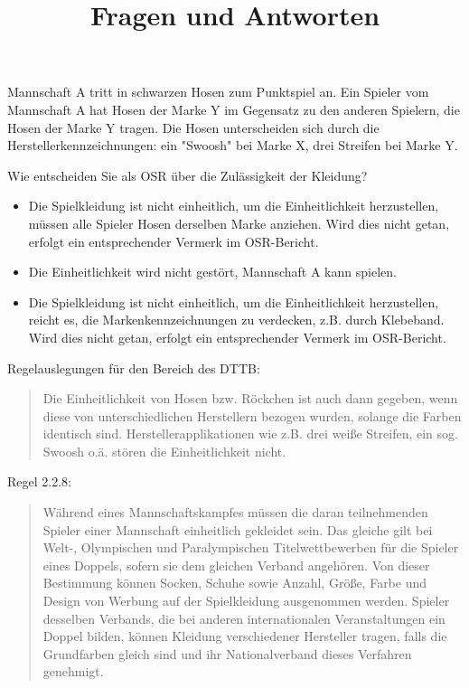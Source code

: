 \documentclass[english, ngerman]{scrartcl}
\title{Fragen und Antworten}
\newcommand{\itemsquarech}[1][black]{%
	\setlength{\unitlength}{1.4ex}%
	\linethickness{1pt}
	\begin{picture}(1,1)(0,0)%
		\color{#1}%
		\moveto(0, 0)%
		\lineto(0, 1)%
		\lineto(1, 1)%
		\lineto(1, 0)%
		\closepath\strokepath%
		\color{green}%
		\Line(0,0)(1,1)
		\Line(0,1)(1,0)
	\end{picture}%
}
\begin{document}
	\maketitle


	Mannschaft A tritt in schwarzen Hosen zum Punktspiel an.
	Ein Spieler vom Mannschaft A hat Hosen der Marke Y im Gegensatz zu den anderen Spielern, die Hosen der Marke Y tragen.
	Die Hosen unterscheiden sich durch die Herstellerkennzeichnungen: ein "Swoosh" bei Marke X, drei Streifen bei Marke Y.

	Wie entscheiden Sie als OSR über die Zulässigkeit der Kleidung?

	\begin{itemize}
		\item Die Spielkleidung ist nicht einheitlich, um die Einheitlichkeit herzustellen, müssen alle Spieler Hosen derselben Marke anziehen.
			Wird dies nicht getan, erfolgt ein entsprechender Vermerk im OSR-Bericht.
		\item[\itemsquarech] Die Einheitlichkeit wird nicht gestört, Mannschaft A kann spielen.
		\item Die Spielkleidung ist nicht einheitlich, um die Einheitlichkeit herzustellen, reicht es, die Markenkennzeichnungen zu verdecken, z.B. durch Klebeband.
			Wird dies nicht getan, erfolgt ein entsprechender Vermerk im OSR-Bericht.
	\end{itemize}

	Regelauslegungen für den Bereich des DTTB:

	\begin{quote}
		Die Einheitlichkeit von Hosen bzw. Röckchen ist auch dann gegeben, wenn diese von unterschiedlichen Herstellern bezogen wurden, solange die Farben identisch sind.
		Herstellerapplikationen wie z.B. drei weiße Streifen, ein sog. Swoosh o.ä. stören die Einheitlichkeit nicht.
	\end{quote}

	Regel 2.2.8:

	\begin{quote}
		Während eines Mannschaftskampfes müssen die daran teilnehmenden Spieler einer Mannschaft einheitlich gekleidet sein.
		Das gleiche gilt bei Welt-, Olympischen und Paralympischen Titelwettbewerben für die Spieler eines Doppels, sofern sie dem gleichen Verband angehören.
		Von dieser Bestimmung können Socken, Schuhe sowie Anzahl, Größe, Farbe und Design von Werbung auf der Spielkleidung ausgenommen werden.
		Spieler desselben Verbands, die bei anderen internationalen Veranstaltungen ein Doppel bilden, können Kleidung verschiedener Hersteller tragen, falls die Grundfarben gleich sind und ihr Nationalverband dieses Verfahren genehmigt.
	\end{quote}
\end{document}
